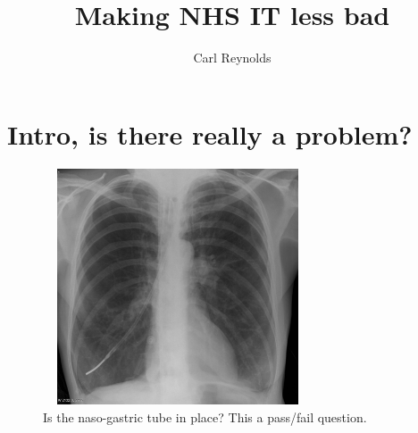 \documentclass[handout, red]{beamer}
\title{Making NHS IT less bad}    %
\author{Carl Reynolds\\}                 %
\institute{@drcjar/carlreynolds.net/openhealthcare.org.uk}      %
\date{}                    %
\begin{document}
\begin{frame}
  \titlepage
\end{frame}


\begin{frame}
  \tableofcontents
\end{frame}

\section{Intro, is there really a problem?}

\begin{frame}
 \begin{figure}[htp]
\centering
\includegraphics[width=8cm,height=7cm]{figs/ng_tube.jpg}
\caption{Is the naso-gastric tube in place? This a pass/fail question.}\label{fig:bugsa}
\end{figure}
 
 \end{frame}
 
\end{document}
